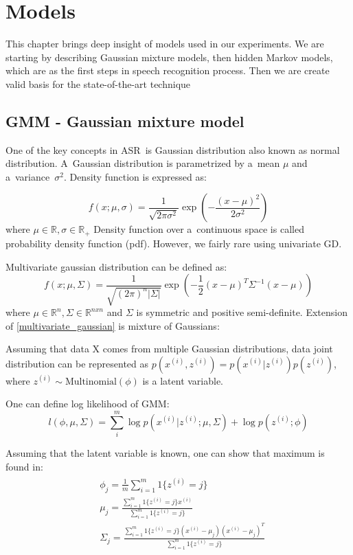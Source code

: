 \chapter{Models}
This chapter brings deep insight of models used in our experiments. We are starting by describing Gaussian mixture models, then hidden Markov models, which are as the first steps in speech recognition process. Then we are create valid basis for the state-of-the-art technique \parencite{mohamed_phone_2010}


\section{GMM - Gaussian mixture model}

One of the key concepts in ASR~is Gaussian distribution \parencite{jurafsky} also known as normal distribution. A~Gaussian distribution is parametrized by a~mean $\mu $ and a~variance~$\sigma ^ 2$. Density function is expressed as:

\begin{equation}
	f(x;\mu,\sigma) = \frac {1}{\sqrt{2\pi\sigma^2}}\exp\left(-\frac{(x-\mu)^2}{2\sigma ^ 2}\right)
	\label{Gaussion Distribution}
\end{equation}
where $\mu \in \mathbb{R}, \sigma \in \mathbb{R}_+$
Density function over a~continuous space is called probability density function (pdf). However, we fairly rare using univariate GD.

Multivariate gaussian distribution can be defined as:
\begin{equation}
	f(x;\mu,\Sigma) = \frac{1}{\sqrt{(2\pi)^n|\Sigma|}}\exp \left( -\frac{1}{2}(x-\mu)^T\Sigma^{-1}(x-\mu) \right)
	\label{multivariate_gaussian}
\end{equation}
where $\mu \in \mathbb{R}^n, \Sigma \in \mathbb{R}^{nxn}$ and $\Sigma$ is symmetric and positive semi-definite.
Extension of \eqref{multivariate_gaussian} is mixture of Gaussians:

Assuming that data X comes from multiple Gaussian distributions, data joint distribution can be represented as $p(x^{(i)},z^{(i)})=p(x^{(i)}|z^{(i)})p(z^{(i)})$, where $z^{(i)}\sim\text{Multinomial}(\phi)$  is a latent variable.

One can define log likelihood of GMM:
\begin{equation}
	l(\phi,\mu,\Sigma)=\sum\limits^m_i \log p(x^{(i)}|z^{(i)};\mu,\Sigma) + \log p(z^{(i)};\phi)
\end{equation}

Assuming that the latent variable is known, one can show that maximum is found in:
\begin{align}
\begin{split}
	\label{gmm_max}
	& \phi_j = \frac{1}{m}\sum\limits^m_{i=1}1\{z^{(i)}=j\} \\
	& \mu_j = \frac{\sum\limits_{i=1}^m1\{z^{(i)}=j\}x^{(i)}}{\sum\limits_{i=1}^m1\{z^{(i)}=j\}} \\
	& \Sigma_j = \frac{\sum\limits_{i=1}^m1\{z^{(i)}=j\}(x^{(i)}-\mu_j)(x^{(i)}-\mu_j)^T}{\sum\limits_{i=1}^m1\{z^{(i)}=j\}}
\end{split}
\end{align}

